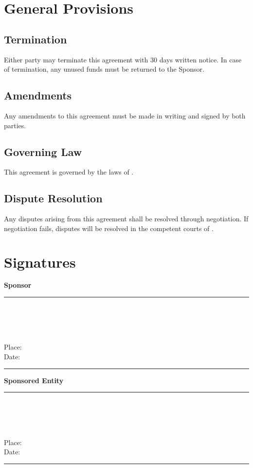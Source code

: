 \documentclass[11pt,a4paper]{article}
\begin{document}
\section{General Provisions}

\subsection{Termination}
Either party may terminate this agreement with 30 days written notice. In case of termination, any unused funds must be returned to the Sponsor.

\subsection{Amendments}
Any amendments to this agreement must be made in writing and signed by both parties.

\subsection{Governing Law}
This agreement is governed by the laws of \jurisdiction.

\subsection{Dispute Resolution}
Any disputes arising from this agreement shall be resolved through negotiation. If negotiation fails, disputes will be resolved in the competent courts of \jurisdiction.

\vspace{2cm}

\section{Signatures}

\begin{minipage}[t]{0.45\textwidth}
    \textbf{Sponsor}\\[1.5cm]
    \rule{5cm}{0.4pt}\\
    \sponsorRepresentative\\
    \sponsorTitle\\
    \sponsorName\\[0.5cm]
    Place: \agreementLocation\\
    Date: \rule{3cm}{0.4pt}
\end{minipage}
\hfill
\begin{minipage}[t]{0.45\textwidth}
    \textbf{Sponsored Entity}\\[1.5cm]
    \rule{5cm}{0.4pt}\\
    \sponsoredRepresentative\\
    \sponsoredTitle\\
    \sponsoredName\\[0.5cm]
    Place: \agreementLocation\\
    Date: \rule{3cm}{0.4pt}
\end{minipage}
\end{document}
